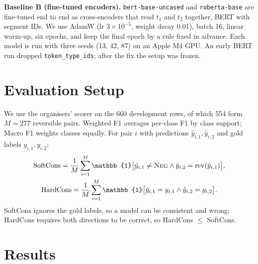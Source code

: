 \documentclass[11pt,a4paper]{article}
\newcommand{\NEG}{\textsc{Neg}}
\DeclareMathOperator{\rev}{rev}
\begin{document}
\textbf{Baseline B (fine-tuned encoders).} \texttt{bert-base-uncased} and \texttt{roberta-base} are fine-tuned end to end as cross-encoders that read $t_1$ and $t_2$ together, BERT with segment IDs. We use AdamW (lr $3\times10^{-5}$, weight decay 0.01), batch 16, linear warm-up, six epochs, and keep the final epoch by a rule fixed in advance. Each model is run with three seeds (13, 42, 87) on an Apple M4 GPU. An early BERT run dropped \texttt{token\_type\_ids}; after the fix the setup was frozen.

\section{Evaluation Setup}
\label{sec:evaluation}

We use the organisers' scorer on the 660 development rows, of which 554 form $M=277$ reversible pairs. Weighted F1 averages per-class F1 by class support; Macro F1 weights classes equally. For pair $i$ with predictions $\hat y_{i,1},\hat y_{i,2}$ and gold labels $y_{i,1},y_{i,2}$:
\begin{gather*}
\mathrm{SoftCons}=\frac{1}{M}\sum_{i=1}^{M} \mathbb{1}\big[\hat y_{i,1}\neq\NEG \wedge \hat y_{i,2}=\rev(\hat y_{i,1})\big],\\
\mathrm{HardCons}=\frac{1}{M}\sum_{i=1}^{M} \mathbb{1}\big[\hat y_{i,1}=y_{i,1}\wedge \hat y_{i,2}=y_{i,2}\big].
\end{gather*}
SoftCons ignores the gold labels, so a model can be consistent and wrong; HardCons requires both directions to be correct, so HardCons $\le$ SoftCons.

\section{Results}
\label{sec:results}
\end{document}
